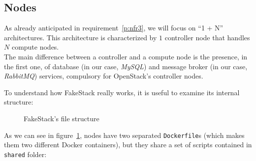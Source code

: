 \subsection{Nodes}
\label{sub:fakestack_scripts}
As already anticipated in requirement~\ref{p:nfr3}, we will focus on ``1 + N'' architectures. This architecture is characterized by $1$ controller node that handles $N$ compute nodes.\\
The main difference between a controller and a compute node is the presence, in the first one, of database (in our case, \textit{MySQL}) and message broker (in our case, \textit{RabbitMQ}) services, compulsory for OpenStack's controller nodes.

To understand how FakeStack really works, it is useful to examine its internal structure:

\begin{figure}[!ht]
\label{fig:fakestack_tree}
\caption{FakeStack's file structure}
\end{figure}

As we can see in figure~\ref{fig:fakestack_tree}, nodes have two separated \texttt{Dockerfile}s (which makes them two different Docker containers), but they share a set of scripts contained in \texttt{shared} folder:

